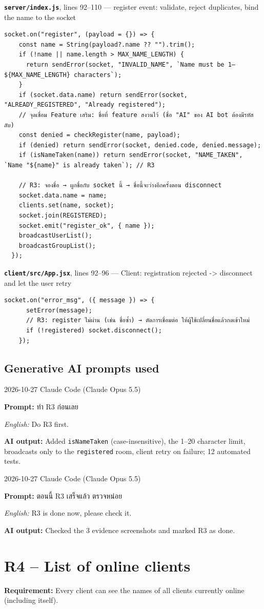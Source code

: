 \documentclass[11pt,a4paper]{article}
\newcommand{\code}[1]{\texttt{#1}}
\newcommand{\req}[1]{\begin{tcolorbox}[colback=accent!6,colframe=accent!60,boxrule=0.5pt,left=4pt,right=4pt,top=2pt,bottom=2pt]\textbf{Requirement:} #1\end{tcolorbox}}
\newcommand{\snap}[3]{\par\medskip\textbf{\code{#1}}, lines #2 --- #3}
\newcommand{\promptbox}[4]{%
\begin{tcolorbox}[colback=codebg,colframe=gray!50,boxrule=0.4pt,left=4pt,right=4pt,top=2pt,bottom=2pt]
{\small #1 \quad Claude Code (Claude Opus 5.5)}\par
\textbf{Prompt:} #2\par
\textit{English:} #3\par
\textbf{AI output:} #4
\end{tcolorbox}}
\begin{document}
\snap{server/index.js}{92--110}{register event: validate, reject duplicates, bind the name to the socket}
\begin{Verbatim}[firstnumber=92]
  socket.on("register", (payload = {}) => {
    const name = String(payload?.name ?? "").trim();
    if (!name || name.length > MAX_NAME_LENGTH) {
      return sendError(socket, "INVALID_NAME", `Name must be 1–${MAX_NAME_LENGTH} characters`);
    }
    if (socket.data.name) return sendError(socket, "ALREADY_REGISTERED", "Already registered");
    // จุดเชื่อม Feature เสริม: ชื่อที่ feature สงวนไว้ (ชื่อ "AI" ของ AI bot ต้องมีรหัสลับ)
    const denied = checkRegister(name, payload);
    if (denied) return sendError(socket, denied.code, denied.message);
    if (isNameTaken(name)) return sendError(socket, "NAME_TAKEN", `Name "${name}" is already taken`); // R3

    // R3: จองชื่อ → ผูกชื่อกับ socket นี้ → ชื่อนี้จะว่างอีกครั้งตอน disconnect
    socket.data.name = name;
    clients.set(name, socket);
    socket.join(REGISTERED);
    socket.emit("register_ok", { name });
    broadcastUserList();
    broadcastGroupList();
  });
\end{Verbatim}

\snap{client/src/App.jsx}{92--96}{Client: registration rejected -> disconnect and let the user retry}
\begin{Verbatim}[firstnumber=92]
    socket.on("error_msg", ({ message }) => {
      setError(message);
      // R3: register ไม่ผ่าน (เช่น ชื่อซ้ำ) → ตัดการเชื่อมต่อ ให้ผู้ใช้เปลี่ยนชื่อแล้วกดเข้าใหม่
      if (!registered) socket.disconnect();
    });
\end{Verbatim}

\subsection*{Generative AI prompts used}
\promptbox{2026-10-27}{ทำ R3 ก่อนเลย}{Do R3 first.}{Added \code{isNameTaken} (case-insensitive), the 1--20 character limit, broadcasts only to the \code{registered} room, client retry on failure; 12 automated tests.}
\promptbox{2026-10-27}{ตอนนี้ R3 เสร็จแล้ว ตรวจหน่อย}{R3 is done now, please check it.}{Checked the 3 evidence screenshots and marked R3 as done.}

\clearpage
\section{R4 -- List of online clients}
\req{Every client can see the names of all clients currently online (including itself).}
\end{document}
